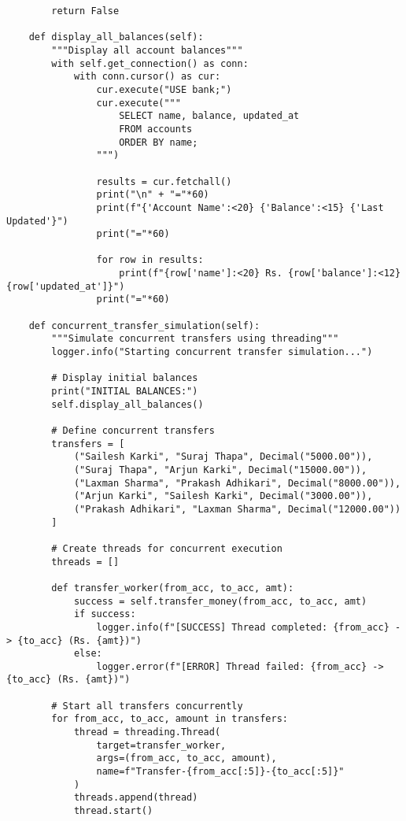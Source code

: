 \begin{verbatim}
        return False

    def display_all_balances(self):
        """Display all account balances"""
        with self.get_connection() as conn:
            with conn.cursor() as cur:
                cur.execute("USE bank;")
                cur.execute("""
                    SELECT name, balance, updated_at
                    FROM accounts
                    ORDER BY name;
                """)

                results = cur.fetchall()
                print("\n" + "="*60)
                print(f"{'Account Name':<20} {'Balance':<15} {'Last Updated'}")
                print("="*60)

                for row in results:
                    print(f"{row['name']:<20} Rs. {row['balance']:<12} {row['updated_at']}")
                print("="*60)

    def concurrent_transfer_simulation(self):
        """Simulate concurrent transfers using threading"""
        logger.info("Starting concurrent transfer simulation...")

        # Display initial balances
        print("INITIAL BALANCES:")
        self.display_all_balances()

        # Define concurrent transfers
        transfers = [
            ("Sailesh Karki", "Suraj Thapa", Decimal("5000.00")),
            ("Suraj Thapa", "Arjun Karki", Decimal("15000.00")),
            ("Laxman Sharma", "Prakash Adhikari", Decimal("8000.00")),
            ("Arjun Karki", "Sailesh Karki", Decimal("3000.00")),
            ("Prakash Adhikari", "Laxman Sharma", Decimal("12000.00"))
        ]

        # Create threads for concurrent execution
        threads = []

        def transfer_worker(from_acc, to_acc, amt):
            success = self.transfer_money(from_acc, to_acc, amt)
            if success:
                logger.info(f"[SUCCESS] Thread completed: {from_acc} -> {to_acc} (Rs. {amt})")
            else:
                logger.error(f"[ERROR] Thread failed: {from_acc} -> {to_acc} (Rs. {amt})")

        # Start all transfers concurrently
        for from_acc, to_acc, amount in transfers:
            thread = threading.Thread(
                target=transfer_worker,
                args=(from_acc, to_acc, amount),
                name=f"Transfer-{from_acc[:5]}-{to_acc[:5]}"
            )
            threads.append(thread)
            thread.start()


\end{verbatim}
